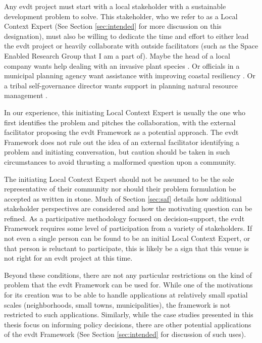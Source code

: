 Any \ac{evdt} project must start with a local stakeholder with a sustainable development problem to solve. This stakeholder, who we refer to as a Local Context Expert (See Section \ref{sec:intended} for more discussion on this designation), must also be willing to dedicate the time and effort to either lead the \ac{evdt} project or heavily collaborate with outside facilitators (such as the Space Enabled Research Group that I am a part of). Maybe the head of a local company wants help dealing with an invasive plant species \cite{ovienmhadaInclusiveDesignEarth2021}. Or officials in a municipal planning agency want assistance with improving coastal resiliency \cite{lombardoEnvironmentVulnerabilityDecisionTechnologyFrameworkDecision2022}.   Or a tribal self-governance director wants support in planning natural resource management \cite{lombardoUtilizingSatelliteEarth2022}.

In our experience, this initiating Local Context Expert is usually the one who first identifies the problem and pitches the collaboration, with the external facilitator proposing the \ac{evdt} Framework as a potential approach. The \ac{evdt} Framework does not rule out the idea of an external facilitator identifying a problem and initiating conversation, but caution should be taken in such circumstances to avoid thrusting a malformed question upon a community.

The initiating Local Context Expert should not be assumed to be the sole representative of their community nor should their problem formulation be accepted as written in stone. Much of Section \ref{sec:saf} details how additional stakeholder perspectives are considered and how the motivating question can be refined. As a participative methodology focused on decision-support, the \ac{evdt} Framework requires some level of participation from a variety of stakeholders. If not even a single person can be found to be an initial Local Context Expert, or that person is reluctant to participate, this is likely be a sign that this venue is not right for an \ac{evdt} project at this time.

Beyond these conditions, there are not any particular restrictions on the kind of problem that the \ac{evdt} Framework can be used for. While one of the motivations for its creation was to be able to handle applications at relatively small spatial scales (neighborhoods, small towns, municipalities), the framework is not restricted to such applications. Similarly, while the case studies presented in this thesis focus on informing policy decisions, there are other potential applications of the \ac{evdt} Framework (See Section \ref{sec:intended} for discussion of such uses). 


